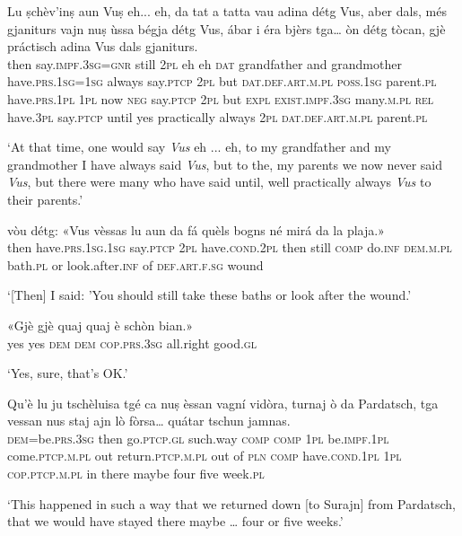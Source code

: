 \begin{linenumbers}
\gll  Lu ṣchèv’inṣ aun Vuṣ eh... eh, da tat a tatta vau adina détg Vus, aber dals, més gjaniturs vajn nuṣ ùssa bégja détg Vus, ábar i éra bjèrs tga… òn détg tòcan, gjè práctisch adina Vus dals gjaniturs.  \\
then say.\textsc{impf.3sg=gnr} still  \textsc{2pl} eh eh \textsc{dat} grandfather and grandmother have.\textsc{prs.1sg=1sg} always say.\textsc{ptcp}  \textsc{2pl}  but \textsc{dat.def.art.m.pl}  \textsc{poss.1sg}  parent.\textsc{pl}  have.\textsc{prs.1pl}  \textsc{1pl}  now \textsc{neg} say.\textsc{ptcp} \textsc{2pl} but \textsc{expl} \textsc{exist.impf.3sg}  many.\textsc{m.pl} \textsc{rel}  have.\textsc{3pl}  say.\textsc{ptcp} until yes practically always  \textsc{2pl}  \textsc{dat.def.art.m.pl}  parent.\textsc{pl} \\
\end{linenumbers}
\medskip
\glt `At that time, one would say \textit{Vus} eh ... eh, to my grandfather and my grandmother I have always said \textit{Vus}, but to the, my parents we now never said \textit{Vus}, but there were many who have said until, well practically always \textit{Vus} to their parents.'
\medskip

\begin{linenumbers}
\gll  [Lu] vòu détg:  «Vus vèssas lu aun da fá quèls bogns né mirá da la plaja.»  \\
then have.\textsc{prs.1sg.1sg}   say.\textsc{ptcp}  \textsc{2pl}  have.\textsc{cond.2pl} then still  \textsc{comp} do.\textsc{inf} \textsc{dem.m.pl} bath.\textsc{pl} or look.after.\textsc{inf} of \textsc{def.art.f.sg} wound   \\
\end{linenumbers}
\medskip
\glt `[Then] I said: 'You should still take these baths or look after the wound.'
\medskip
\begin{linenumbers}

\gll  «Gjè gjè quaj quaj è schòn bian.»  \\
yes yes \textsc{dem} \textsc{dem} \textsc{cop.prs.3sg} all.right good.\textsc{gl}  \\
\end{linenumbers}
\medskip
\glt `Yes, sure, that’s OK.'
\medskip

\begin{linenumbers}
\gll  Qu'è lu ju tschèluisa tgé ca nuṣ èssan vagní vidòra, turnaj ò da Pardatsch, tga vessan nus staj ajn lò fòrsa… quátar tschun jamnas.  \\
 \textsc{dem}=be.\textsc{prs.3sg} then go.\textsc{ptcp.gl} such.way \textsc{comp} \textsc{comp} \textsc{1pl} be.\textsc{impf.1pl} come.\textsc{ptcp.m.pl} out  return.\textsc{ptcp.m.pl} out of \textsc{pln} \textsc{comp}  have.\textsc{cond.1pl} \textsc{1pl} \textsc{cop.ptcp.m.pl} in there maybe four five week.\textsc{pl}   \\
\end{linenumbers}
\medskip
\glt `This happened in such a way that we returned down [to Surajn] from Pardatsch, that we would have stayed there maybe … four or five weeks.'
\medskip

